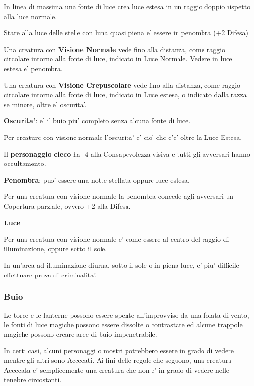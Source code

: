 \documentclass[a4paper,11pt,twoside,openany]{book}
\begin{document}
{		\bigskip
		
		In linea di massima una fonte di luce crea luce estesa in un raggio doppio rispetto alla luce normale.
		
		Stare alla luce delle stelle con luna quasi piena e' essere in penombra (+2 Difesa)
		
		Una creatura con \textbf{Visione Normale} vede fino alla distanza, come raggio circolare intorno alla fonte di luce, indicato in Luce Normale. Vedere in luce estesa e' penombra.
		
		Una creatura con \textbf{Visione Crepuscolare} vede fino alla distanza, come raggio circolare intorno alla fonte di luce, indicato in Luce estesa, o indicato dalla razza se minore, oltre e' oscurita'.
		
		\textbf{Oscurita'}: e' il buio piu' completo senza alcuna fonte di luce.
		
		Per creature con visione normale l'oscurita' e' cio' che c'e' oltre la Luce Estesa.
		
		Il \textbf{personaggio cieco} ha -4 alla Consapevolezza visiva e tutti gli avversari hanno occultamento.
		
		\textbf{Penombra}: puo' essere una notte stellata oppure luce estesa.
		
		Per una creatura con visione normale la penombra concede agli avversari
		un Copertura parziale, ovvero +2 alla Difesa.
		
		\textbf{Luce}
		
		Per una creatura con visione normale e' come essere al centro del raggio di illuminazione, oppure sotto il sole.
		
		In un'area ad illuminazione diurna, sotto il sole o in piena luce, e' piu' difficile effettuare prova di criminalita'.
		
		\subsubsection{Buio}
		
		\label{buio}
		
		Le torce e le lanterne possono essere spente all'improvviso da una folata di vento, le fonti di luce magiche possono essere dissolte o contrastate ed alcune trappole magiche possono creare aree di buio impenetrabile.
		
		In certi casi, alcuni personaggi o mostri potrebbero essere in grado di vedere mentre gli altri sono Accecati. Ai fini delle regole che seguono, una creatura Accecata e' semplicemente una creatura che non e' in grado di vedere nelle tenebre circostanti.
		
}
\end{document}
